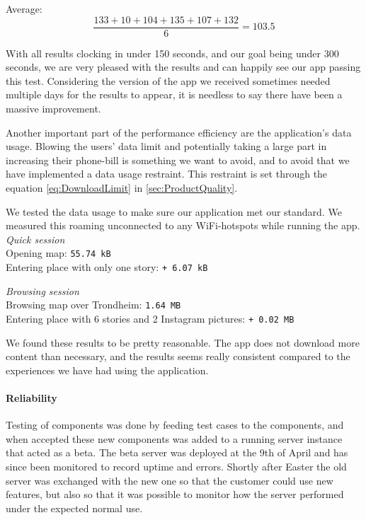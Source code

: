 Average: 
\begin{equation}
\frac{133 + 10 + 104 + 135 + 107 + 132}{6} = {103.5}
\end{equation}

With all results clocking in under 150 seconds, and our goal being under 300 seconds, we are very pleased with the results and can happily see our app passing this test. Considering the version of the app we received sometimes needed multiple days for the results to appear, it is needless to say there have been a massive improvement.


Another important part of the performance efficiency are the application's data usage. Blowing the users' data limit and potentially taking a large part in increasing their phone-bill is something we want to avoid, and to avoid that we have implemented a data usage restraint. This restraint is set through the equation \ref{eq:DownloadLimit} in \ref{sec:ProductQuality}.

We tested the data usage to make sure our application met our standard. We measured this roaming unconnected to any WiFi-hotspots while running the app.\\

\emph{Quick session}\\
Opening map: \texttt{55.74 kB}\\
Entering place with only one story: \texttt{+ 6.07 kB}

\emph{Browsing session}\\
Browsing map over Trondheim: \texttt{1.64 MB}\\
Entering place with 6 stories and 2 Instagram pictures: \texttt{+ 0.02 MB}

We found these results to be pretty reasonable. The app does not download more content than necessary, and the results seems really consistent compared to the experiences we have had using the application.

\paragraph{Reliability}

Testing of components was done by feeding test cases to the components, and when accepted these new components was added to a running server instance that acted as a beta. The beta server was deployed at the 9th of April and has since been monitored to record uptime and errors. Shortly after Easter the old server was exchanged with the new one so that the customer could use new features, but also so that it was possible to monitor how the server performed under the expected normal use.

